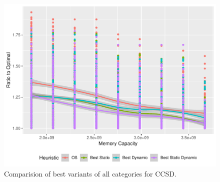 \documentclass[runningheads]{llncs} %
\begin{document}
	
	\begin{figure}[htb]
		\begin{center}
		\includegraphics[scale=0.7]{./ratio_to_optimal_ccsd-best.pdf}
		\caption{Comparision of best variants of all categories for CCSD.}
		\label{fig:ratio_to_optimal_best_ccsd}
		\end{center}
	\end{figure}
	
\end{document}
